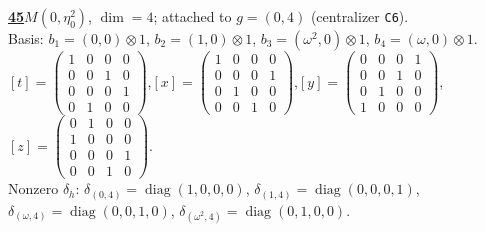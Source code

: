 \begin{samepage}\noindent\textbf{\underline{45}}\quad $M(0,\eta^{2}_{0})$, $\dim=4$; attached to $g=(0,4)$ (centralizer \texttt{C6}).\\
Basis: $b_{1}=(0,0)\otimes 1$, $b_{2}=(1,0)\otimes 1$, $b_{3}=(\omega^2,0)\otimes 1$, $b_{4}=(\omega,0)\otimes 1$.\\
$[t]=\left(\begin{smallmatrix} 1 & 0 & 0 & 0 \\ 0 & 0 & 1 & 0 \\ 0 & 0 & 0 & 1 \\ 0 & 1 & 0 & 0 \end{smallmatrix}\right)$,\quad $[x]=\left(\begin{smallmatrix} 1 & 0 & 0 & 0 \\ 0 & 0 & 0 & 1 \\ 0 & 1 & 0 & 0 \\ 0 & 0 & 1 & 0 \end{smallmatrix}\right)$,\quad $[y]=\left(\begin{smallmatrix} 0 & 0 & 0 & 1 \\ 0 & 0 & 1 & 0 \\ 0 & 1 & 0 & 0 \\ 1 & 0 & 0 & 0 \end{smallmatrix}\right)$,\quad $[z]=\left(\begin{smallmatrix} 0 & 1 & 0 & 0 \\ 1 & 0 & 0 & 0 \\ 0 & 0 & 0 & 1 \\ 0 & 0 & 1 & 0 \end{smallmatrix}\right)$.\\
Nonzero $\delta_h$: $\delta_{(0,4)}=\operatorname{diag}(1,0,0,0)$, $\delta_{(1,4)}=\operatorname{diag}(0,0,0,1)$, $\delta_{(\omega,4)}=\operatorname{diag}(0,0,1,0)$, $\delta_{(\omega^2,4)}=\operatorname{diag}(0,1,0,0)$.\end{samepage}
\medskip

